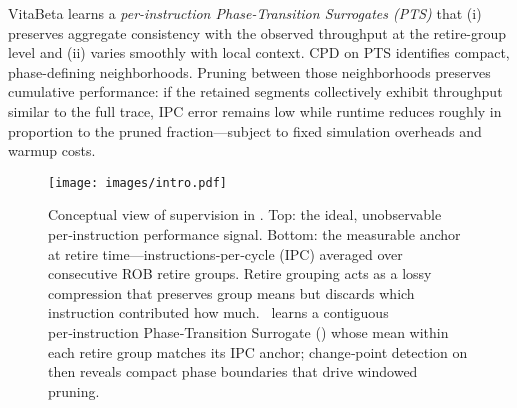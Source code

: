 VitaBeta learns a \emph{per-instruction Phase-Transition Surrogates (PTS)} that (i) preserves aggregate consistency with the observed throughput at the retire-group level and (ii) varies smoothly with local context. CPD on PTS identifies compact, phase-defining neighborhoods. Pruning between those neighborhoods preserves cumulative performance: if the retained segments collectively exhibit throughput similar to the full trace, IPC error remains low while runtime reduces roughly in proportion to the pruned fraction—subject to fixed simulation overheads and warmup costs.

\begin{figure}[!htbp]
    \centering
    \setlength{\belowcaptionskip}{-10pt}
    \captionsetup{skip=0pt}
    \captionsetup[subfigure]{font=footnotesize, skip=1pt}
    \texttt{[image: images/intro.pdf]}
    \caption{Conceptual view of supervision in \name. Top: the ideal, unobservable per‑instruction performance signal. Bottom: the measurable anchor at retire time—instructions‑per‑cycle (IPC) averaged over consecutive ROB retire groups. Retire grouping acts as a lossy compression that preserves group means but discards which instruction contributed how much. \name\ learns a contiguous per‑instruction Phase‑Transition Surrogate (\pts) whose mean within each retire group matches its IPC anchor; change‑point detection on \pts then reveals compact phase boundaries that drive windowed pruning.}
 
    \label{fig:conceptual}
\end{figure}
